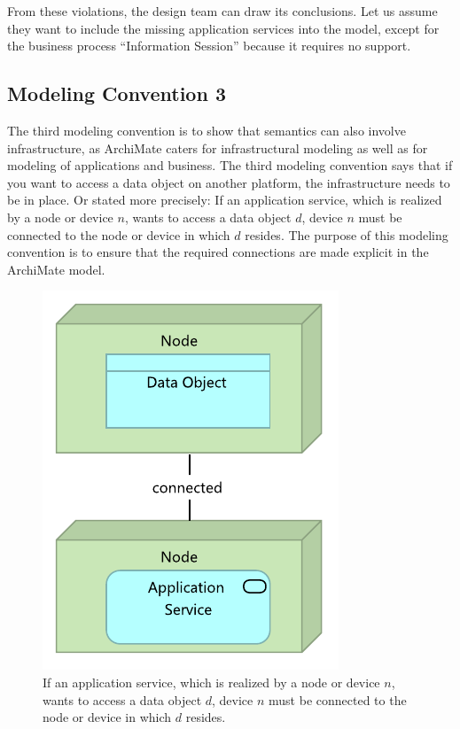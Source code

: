 \documentclass[sn-vancouver]{sn-jnl}%
\theoremstyle{thmstyleone}%
\theoremstyle{thmstyletwo}%
\theoremstyle{thmstylethree}%
\begin{document}
From these violations, the design team can draw its conclusions.
Let us assume they want to include the missing application services into the model,
except for the business process ``Information Session'' because it requires no support.

\subsection{Modeling Convention 3}
The third modeling convention is to show that semantics can also involve infrastructure,
as ArchiMate caters for infrastructural modeling as well as for modeling of applications and business.
The third modeling convention says that if you want to access a data object on another platform, the infrastructure needs to be in place.
Or stated more precisely:
If an application service, which is realized by a node or device $n$, wants to access a data object $d$,
device $n$ must be connected to the node or device in which $d$ resides.
The purpose of this modeling convention is to ensure that the required connections are made explicit in the ArchiMate model.

\begin{figure}[b]
\centering
\includegraphics[clip=true, scale=0.7]{MC3}
\caption{\small{If an application service, which is realized by a node or device $n$, wants to access a data object $d$,
device $n$ must be connected to the node or device in which $d$ resides.}}
\label{MC3}
\end{figure}
\end{document}
